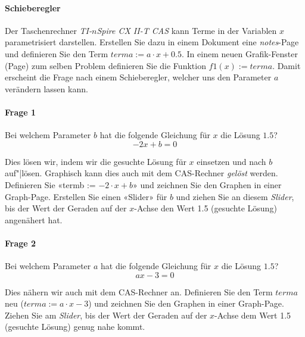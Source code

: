 
\paragraph{Schieberegler} Der Taschenrechner \textit{TI-$n$Spire CX
  II-T CAS} kann Terme in der Variablen $x$ parametrisiert
darstellen. Erstellen Sie dazu in einem Dokument eine
\textit{notes}-Page und definieren Sie den Term $terma := a\cdot
x+0.5$. In einem neuen Grafik-Fenster (Page) zum selben Problem
definieren Sie die Funktion $f1(x):=terma$. Damit erscheint die Frage
nach einem Schieberegler, welcher uns den Parameter $a$ verändern
lassen kann.



\paragraph{Frage 1} Bei welchem Parameter $b$ hat die folgende Gleichung für $x$ die Lösung $1.5$?
$$-2x + b = 0$$

Dies lösen wir, indem wir die gesuchte Lösung für $x$ einsetzen und nach $b$ auf"|lösen. Graphisch kann dies auch mit dem CAS-Rechner \textit{gelöst} werden. Definieren Sie «termb := $-2\cdot{}x+b$» und zeichnen Sie den Graphen in einer Graph-Page.
Erstellen Sie einen «Slider» für $b$ und ziehen Sie an
diesem \textit{Slider}, bis der Wert der Geraden auf der $x$-Achse den
Wert 1.5 (gesuchte Lösung) angenähert hat.


\paragraph{Frage 2} Bei welchem Parameter $a$ hat die folgende Gleichung für $x$ die Lösung $1.5$?
$$ax-3=0$$

Dies nähern wir auch mit dem CAS-Rechner an. Definieren Sie den Term
$terma$ neu ($terma := a\cdot{}x-3$) und zeichnen Sie den Graphen in einer Graph-Page.
Ziehen Sie am \textit{Slider}, bis der Wert der Geraden auf der
$x$-Achse dem Wert 1.5 (gesuchte Lösung) genug nahe kommt.
